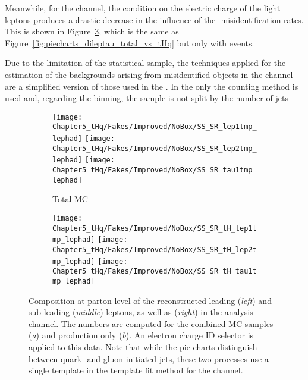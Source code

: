 Meanwhile, for the \dilepSStau channel, the condition on the electric charge of the
light leptons produces a drastic decrease in the influence of the \tauhad-misidentification rates.
This is shown in Figure~\ref{fig:piecharts_dileptau_SS_total_vs_tHq}, which is the same
as Figure~\ref{fig:piecharts_dileptau_total_vs_tHq} but only with \dilepSStau events.

Due to the limitation of the statistical sample, the techniques applied for the estimation of the backgrounds 
arising from misidentified objects in the \dilepSStau channel are
a simplified version of those used in the \dilepOStau.
In the  \dilepSStau only the counting method is used and, regarding the binning, the sample is not split by the number of \btagged jets

 


\begin{figure}[h]
  \begin{subfigure}[b]{\linewidth}
       \centering
       \texttt{[image: Chapter5\_tHq/Fakes/Improved/NoBox/SS\_SR\_lep1tmp\_lephad]}
       \texttt{[image: Chapter5\_tHq/Fakes/Improved/NoBox/SS\_SR\_lep2tmp\_lephad]}
       \texttt{[image: Chapter5\_tHq/Fakes/Improved/NoBox/SS\_SR\_tau1tmp\_lephad]}
       \caption{Total MC}
       \label{fig:piecharts_dileptau_SS_total_vs_tHq:tot}
  \end{subfigure}
  \begin{subfigure}[b]{\linewidth}
      \centering
      \texttt{[image: Chapter5\_tHq/Fakes/Improved/NoBox/SS\_SR\_tH\_lep1tmp\_lephad]}
      \texttt{[image: Chapter5\_tHq/Fakes/Improved/NoBox/SS\_SR\_tH\_lep2tmp\_lephad]}
      \texttt{[image: Chapter5\_tHq/Fakes/Improved/NoBox/SS\_SR\_tH\_tau1tmp\_lephad]}
      \caption{\tHq}
      \label{fig:piecharts_dileptau_SS_total_vs_tHq:tHq}
  \end{subfigure}
   \caption{Composition at parton level of the reconstructed leading (\textit{left}) and sub-leading (\textit{middle}) leptons, as well as
   \tauhad (\textit{right}) in the \dilepSStau analysis channel. The numbers are computed for the combined
   MC samples (\textit{a}) and \tHq production only (\textit{b}). An electron charge ID selector is applied to this data.
   Note that while the pie charts distinguish between quark- and gluon-initiated jets, these two processes use a single 
   template in the template fit method for the \dilepSStau channel.}
   \label{fig:piecharts_dileptau_SS_total_vs_tHq}
\end{figure}

